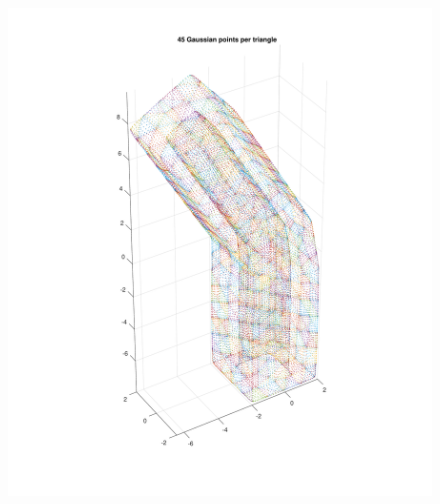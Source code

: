 \documentclass[11pt, oneside]{article}   	%
\begin{document}
\begin{figure}[H]
\begin{center}
\includegraphics[width=6in]{open_cavity_points.pdf}
\end{center}
\caption{}
\label{open_cavity_points}
\end{figure}
\end{document}
